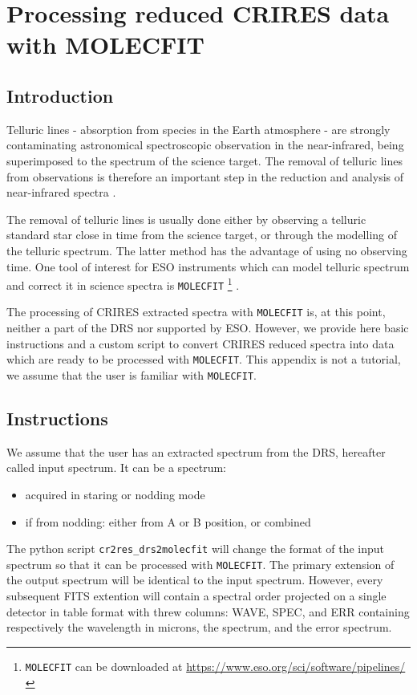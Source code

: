 \section{Processing reduced CRIRES data with MOLECFIT}
\label{sec:molecfit}


\subsection*{Introduction}

Telluric lines - absorption from species in the Earth atmosphere - are strongly 
contaminating astronomical spectroscopic observation in the near-infrared, being
superimposed to the spectrum of the science target. The removal
of telluric lines from observations is therefore an important step in the reduction
and analysis of near-infrared spectra .

The removal of telluric lines is usually done either by observing a telluric standard star
close in time from the science target, or through the modelling of the telluric spectrum.
The latter method has the advantage of using no observing time. One tool of interest for 
ESO instruments which can model telluric spectrum and correct it in science spectra is {\tt MOLECFIT}
\footnote{{\tt MOLECFIT} can be downloaded at \url{https://www.eso.org/sci/software/pipelines/}} 
 \cite{smette-molecfit}.

The processing of CRIRES extracted spectra with {\tt MOLECFIT} is, at this point, neither
a part of the DRS nor supported by ESO. However, we provide here basic instructions and a custom script to convert
CRIRES reduced spectra into data which are ready to be processed with {\tt MOLECFIT}. This appendix
is not a tutorial, we assume that the user is familiar with {\tt MOLECFIT}. 

\subsection*{Instructions}

We assume that the user has an extracted spectrum from the DRS, hereafter called input spectrum. It can be a spectrum:
\begin{itemize}
  \item acquired in staring or nodding mode
  \item  if from nodding: either from A or B position, or combined
\end{itemize}

The python script \verb!cr2res_drs2molecfit! will change the format of the input spectrum so that it can be processed with
{\tt MOLECFIT}. The primary extension of the output spectrum will be identical to the input spectrum. However,
every subsequent FITS extention will contain a spectral order projected on a single detector in table format with
threw columns: WAVE, SPEC, and ERR containing respectively the wavelength in microns, the spectrum, and the error spectrum.

